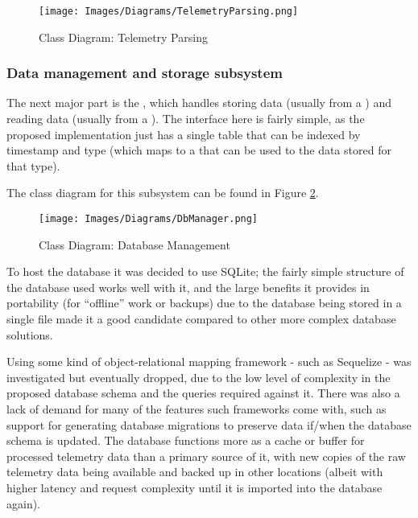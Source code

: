 \begin{figure}[H]
  \centering
  \texttt{[image: Images/Diagrams/TelemetryParsing.png]}
  \caption{Class Diagram: Telemetry Parsing}
  \label{fig:cdparsing}
\end{figure}

\subsubsection{Data management and storage subsystem}
The next major part is the , which handles storing data (usually from a ) and reading data (usually from a ). The interface here is fairly simple, as the proposed implementation just has a single table that can be indexed by timestamp and type (which maps to a  that can be used to  the data stored for that type).


The class diagram for this subsystem can be found in Figure \ref{fig:cddb}.

\begin{figure}[H]
  \centering
  \texttt{[image: Images/Diagrams/DbManager.png]}
  \caption{Class Diagram: Database Management}
  \label{fig:cddb}
\end{figure}

To host the database it was decided to use SQLite; the fairly simple structure of the database used works well with it, and the large benefits it provides in portability (for “offline” work or backups) due to the database being stored in a single file made it a good candidate compared to other more complex database solutions.

Using some kind of object-relational mapping framework - such as Sequelize - was investigated but eventually dropped, due to the low level of complexity in the proposed database schema and the queries required against it. There was also a lack of demand for many of the features such frameworks come with, such as support for generating database migrations to preserve data if/when the database schema is updated. The database functions more as a cache or buffer for processed telemetry data than a primary source of it, with new copies of the raw telemetry data being available and backed up in other locations (albeit with higher latency and request complexity until it is imported into the database again).

